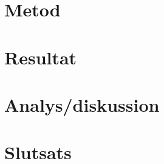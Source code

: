 \documentclass[a4paper, 12pt]{article}
\begin{document}
\section{Metod}

\section{Resultat}

\section{Analys/diskussion}



\section{Slutsats}


\printbibliography
\end{document}
